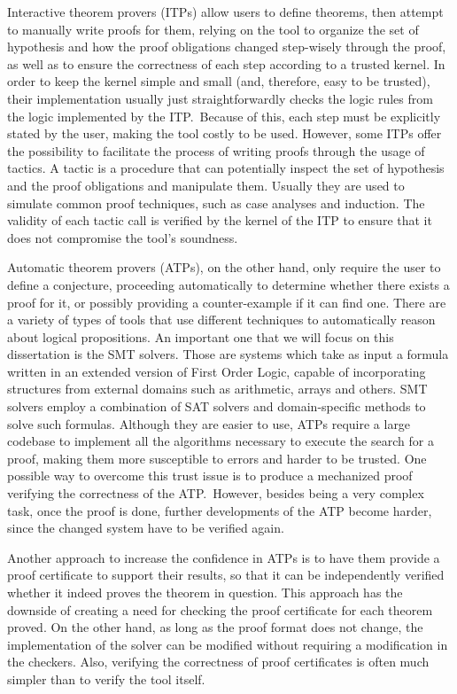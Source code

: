Interactive theorem provers (ITPs) allow users to define
theorems, then attempt to manually write proofs for them,
relying on the tool to organize the set of hypothesis and
how the proof obligations changed step-wisely through the
proof, as well as to ensure the correctness of each step
according to a trusted kernel.
%
In order to keep the kernel simple and small (and, therefore,
easy to be trusted), their implementation usually just
straightforwardly checks the logic rules from the logic
implemented by the ITP.\ Because of this, each step must be
explicitly stated by the user, making the tool costly to be
used. However, some ITPs offer the possibility to facilitate
the process of writing proofs through the usage of tactics.
A tactic is a procedure that can potentially inspect the
set of hypothesis and the proof obligations and manipulate
them. Usually they are used to simulate common proof
techniques, such as case analyses and induction. The
validity of each tactic call is verified by the kernel
of the ITP to ensure that it does not compromise the tool's
soundness.
%

Automatic theorem provers (ATPs), on the other hand,
only require the user to define a conjecture, proceeding
automatically to determine whether there exists a proof
for it, or possibly providing a counter-example if it
can find one.
%
There are a variety of types of tools that use different
techniques to automatically reason about logical propositions. An important one
that we will focus on this dissertation is the SMT solvers. Those are
systems which take as input a formula written in an extended version of First Order Logic,
capable of incorporating structures from external domains such as arithmetic,
arrays and others. SMT solvers employ a combination of SAT solvers and
domain-specific methods to solve such formulas.
%
Although they are easier to use, ATPs require a large
codebase to implement all the algorithms necessary to execute
the search for a proof, making them more susceptible to
errors and harder to be trusted. One possible way to overcome
this trust issue is to produce a mechanized proof verifying
the correctness of the ATP.\ However, besides being a very
complex task, once the proof is done, further developments of
the ATP become harder, since the changed system have to be
verified again.

Another approach to increase the confidence in ATPs is to have them provide a
proof certificate to support their results, so that it can be independently verified whether
it indeed proves the theorem in question. This approach has the downside of creating a need
for checking the proof certificate for each theorem proved.
On the other hand, as long as the proof format does not change, the implementation
of the solver can be modified without requiring a modification in the checkers. Also,
verifying the correctness of proof certificates is often much simpler than to verify
the tool itself.

